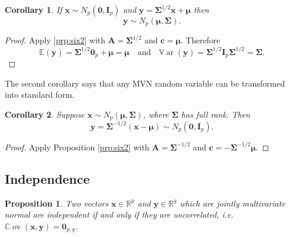 \documentclass[
]{book}
\newtheorem{corollary}{Corollary}[chapter]
\newtheorem{proposition}{Proposition}[chapter]
\theoremstyle{definition}
\theoremstyle{definition}
\theoremstyle{definition}
\theoremstyle{definition}
\theoremstyle{remark}
\begin{document}
\begin{corollary}
\protect\hypertarget{cor:csix2}{}\label{cor:csix2}If \(\mathbf x\sim N_p({\boldsymbol 0},\mathbf I_p)\) and \(\mathbf y= \boldsymbol{\Sigma}^{1/2} \mathbf x+ {\boldsymbol{\mu}}\) then \[\mathbf y\sim N_p({\boldsymbol{\mu}},\boldsymbol{\Sigma}).\]
\end{corollary}

\begin{proof}
Apply \ref{prp:six2} with \(\mathbf A= \boldsymbol{\Sigma}^{1/2}\) and \(\mathbf c= {\boldsymbol{\mu}}\). Therefore
\[{\mathbb{E}}(\mathbf y) = \boldsymbol{\Sigma}^{1/2} {\boldsymbol 0}_p + {\boldsymbol{\mu}}= {\boldsymbol{\mu}}\quad \mbox{and}\quad {\mathbb{V}\operatorname{ar}}(\mathbf y) = \boldsymbol{\Sigma}^{1/2} \mathbf I_p \boldsymbol{\Sigma}^{1/2} = \boldsymbol{\Sigma}.\]
\end{proof}

The second corollary says that any MVN random variable can be transformed into standard form.

\begin{corollary}
\protect\hypertarget{cor:csix3}{}\label{cor:csix3}Suppose \(\mathbf x\sim N_p({\boldsymbol{\mu}},\boldsymbol{\Sigma})\), where \(\boldsymbol{\Sigma}\) has full rank. Then\\
\[\mathbf y= \boldsymbol{\Sigma}^{-1/2}(\mathbf x- {\boldsymbol{\mu}}) \sim N_p({\boldsymbol 0},\mathbf I_p).\]
\end{corollary}

\begin{proof}
Apply Proposition \ref{prp:six2} with \(\mathbf A= \boldsymbol{\Sigma}^{-1/2}\) and \(\mathbf c= - \boldsymbol{\Sigma}^{-1/2} {\boldsymbol{\mu}}\).
\end{proof}

\hypertarget{independence}{%
\subsection{Independence}\label{independence}}

\begin{proposition}
\protect\hypertarget{prp:six4}{}\label{prp:six4}Two vectors \(\mathbf x\in\mathbb{R}^p\) and \(\mathbf y\in\mathbb{R}^q\) which are jointly multivariate normal are independent if and only if they are uncorrelated, i.e.~\({\mathbb{C}\operatorname{ov}}(\mathbf x,\mathbf y) = {\boldsymbol 0}_{p,q}\).
\end{proposition}
\end{document}
